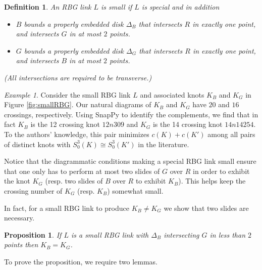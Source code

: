 \documentclass [11pt]{amsart}
\newtheorem {proposition}[theorem]{Proposition}
\newtheorem {definition}[theorem]{Definition}
\theoremstyle{remark}
\newtheorem {example}[theorem]{Example}
\begin{document}
\begin{definition}
\label{def:small}
An RBG link $L$ is \emph{small} if $L$ is special and in addition 
\begin{itemize}
\item $B$ bounds a properly embedded disk $\Delta_B$ that intersects $R$ in exactly one point, and intersects $G$ in at most $2$ points.
\item $G$ bounds a properly embedded disk $\Delta_G$ that intersects $R$ in exactly one point, and intersects $B$ in at most $2$ points.
\end{itemize} 
(All intersections are required to be transverse.)
\end{definition}

\begin{example}\label{ex:smallrbg}
Consider the small RBG link $L$ and associated knots $K_B$ and $K_G$ in Figure \ref{fig:smallRBG}. Our natural diagrams of $K_B$ and $K_G$ have $20$ and $16$ crossings, respectively. Using SnapPy to identify the complements, we find that in fact $K_B$ is the 12 crossing knot $12n309$ and $K_G$ is the 14 crossing knot $14n14254$. To the authors' knowledge, this pair minimizes $c(K)+c(K')$ among all pairs of distinct knots with $S^3_0(K)\cong S^3_0(K')$ in the literature. 
\end{example}

Notice that the diagrammatic conditions making a special RBG link small ensure that one only has to perform at most two slides of $G$ over $R$ in order to exhibit the knot $K_G$ (resp. two slides of $B$ over $R$ to exhibit $K_B$). This helps keep the crossing number of $K_G$ (resp. $K_B$) somewhat small.

 In fact, for a small RBG link to produce $K_B\neq K_G$ we show that two slides are necessary.

\begin{proposition}\label{prop:notthatsmall}
If $L$ is a small RBG link with $\Delta_B$ intersecting $G$ in less than $2$ points then $K_B=K_G$.
\end{proposition}

To prove the proposition, we require two lemmas.
\end{document}
